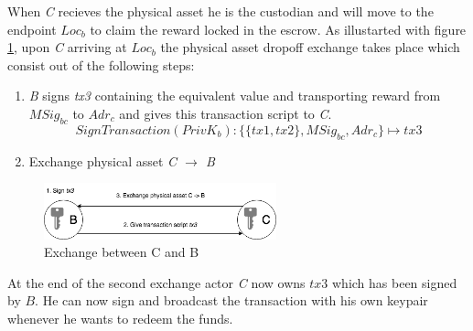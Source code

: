  When \textit{C} recieves the physical asset he is the custodian and will move to the endpoint \(Loc_b\) to claim the reward locked in the escrow. As illustarted with figure \ref{fig:3 dropoff exchange}, upon \textit{C} arriving at \(Loc_b\) the physical asset dropoff exchange takes place which consist out of the following steps:

\begin{enumerate}
  \item \textit{B} signs \textit{tx3} containing the equivalent value and transporting reward from $MSig_{bc}$ to $Adr_c$ and gives this transaction script to \textit{C}.
  \[SignTransaction(PrivK_b)\colon\{\{tx1, tx2\}, MSig_{bc}, Adr_c\}\mapsto tx3\]
  \item Exchange physical asset \textit{C $\rightarrow$ B}
\end{enumerate}

\begin{figure}[h]
\centering
\includegraphics[width=0.6\textwidth]{images/exchange_02.png}
\caption{Exchange between C and B}
\label{fig:3 dropoff exchange}
\end{figure}

At the end of the second exchange actor \textit{C} now owns $tx3$ which has been signed by $B$. He can now sign and broadcast the transaction with his own keypair whenever he wants to redeem the funds.
